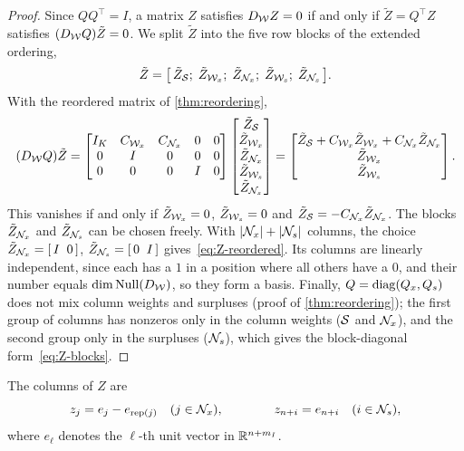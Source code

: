 \begin{proof}
Since $QQ^\top = I$, a matrix $Z$ satisfies $D_{\mathcal{W}} Z = 0$ if and only if $\tilde Z = Q^\top Z$
satisfies $(D_{\mathcal{W}} Q)\tilde Z = 0$. We split $\tilde Z$ into the five row blocks of the extended
ordering,
\[
\tilde Z = \bigl[\,\tilde Z_{\mathcal{S}};\; \tilde Z_{\mathcal{W}_x};\; \tilde Z_{\mathcal{N}_x};\; \tilde Z_{\mathcal{W}_s};\; \tilde Z_{\mathcal{N}_s}\,\bigr].
\]
With the reordered matrix of \cref{thm:reordering},
\[
(D_{\mathcal{W}} Q)\tilde Z =
\begin{bmatrix}
I_K & C_{\mathcal{W}_x} & C_{\mathcal{N}_x} & 0 & 0\\
0 & I & 0 & 0 & 0\\
0 & 0 & 0 & I & 0
\end{bmatrix}
\begin{bmatrix} \tilde Z_{\mathcal{S}}\\ \tilde Z_{\mathcal{W}_x}\\ \tilde Z_{\mathcal{N}_x}\\ \tilde Z_{\mathcal{W}_s}\\ \tilde Z_{\mathcal{N}_s}\end{bmatrix}
=
\begin{bmatrix} \tilde Z_{\mathcal{S}} + C_{\mathcal{W}_x}\tilde Z_{\mathcal{W}_x} + C_{\mathcal{N}_x}\tilde Z_{\mathcal{N}_x}\\ \tilde Z_{\mathcal{W}_x}\\ \tilde Z_{\mathcal{W}_s}\end{bmatrix}.
\]
This vanishes if and only if $\tilde Z_{\mathcal{W}_x} = 0$, $\tilde Z_{\mathcal{W}_s} = 0$ and
$\tilde Z_{\mathcal{S}} = -C_{\mathcal{N}_x}\tilde Z_{\mathcal{N}_x}$. The blocks $\tilde Z_{\mathcal{N}_x}$ and $\tilde Z_{\mathcal{N}_s}$ can be
chosen freely. With $|\mathcal{N}_x| + |\mathcal{N}_s|$ columns, the choice $\tilde Z_{\mathcal{N}_x} = [\,I\;\;0\,]$,
$\tilde Z_{\mathcal{N}_s} = [\,0\;\;I\,]$ gives~\eqref{eq:Z-reordered}. Its columns are
linearly independent, since each has a $1$ in a position where all others have a $0$, and their
number equals $\dim\operatorname{Null}(D_{\mathcal{W}})$, so they form a basis. Finally, $Q = \operatorname{diag}(Q_x, Q_s)$ does not mix column weights and surpluses (proof of
\cref{thm:reordering}); the first group of columns has nonzeros only in the column weights
($\mathcal{S}$ and $\mathcal{N}_x$), and the second group only in the surpluses ($\mathcal{N}_s$), which gives the
block-diagonal form~\eqref{eq:Z-blocks}.
\end{proof}

\begin{cor} \label{cor:z-explicit}
The columns of $Z$ are
\begin{equation} \label{eq:z-explicit}
z_j = e_j - e_{\operatorname{rep}(j)}\quad (j\in\mathcal{N}_x),\qquad\qquad z_{n+i} = e_{n+i}\quad (i\in\mathcal{N}_s),
\end{equation}
where $e_\ell$ denotes the $\ell$-th unit vector in $\mathbb{R}^{n+m_I}$.
\end{cor}

